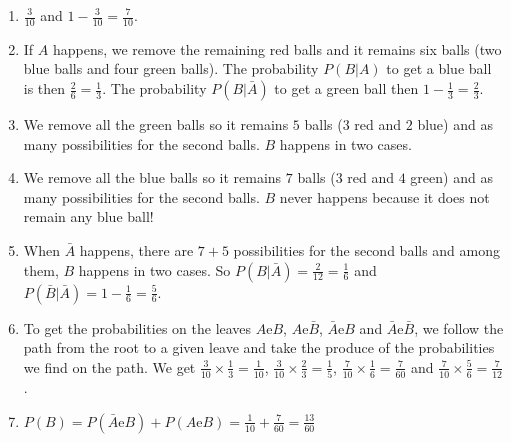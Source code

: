 \begin{enumerate}
\item $\frac{3}{10}$ and $1 - \frac{3}{10} = \frac{7}{10}$.

\item If $A$ happens, we remove the remaining red balls and it remains
  six balls (two blue balls and four green balls). The probability
  $P(B|A)$ to get a blue ball is then $\frac{2}{6} = \frac{1}{3}$.
  The probability $P(B|\bar{A})$ to get a green ball then
  $1 - \frac{1}{3} = \frac{2}{3}$.

\item We remove all the green balls so it remains $5$ balls
  ($3$ red and $2$ blue) and as many possibilities for the second balls.
  $B$ happens in two cases.

\item We remove all the blue balls so it remains $7$ balls
  ($3$ red and $4$ green) and as many possibilities for the second balls.
  $B$ never happens because it does not remain any blue ball!

\item When $\bar{A}$ happens, there are $7+5$ possibilities for the second
  balls and among them, $B$ happens in two cases.
  So $P(B|\bar{A}) = \frac{2}{12} = \frac{1}{6}$ and
  $P(\bar{B}|\bar{A}) = 1 - \frac{1}{6} = \frac{5}{6}$.

\begin{center}
\end{center}

\item To get the probabilities on the leaves
  $A \text{e} B$, $A \text{e} \bar{B}$, $\bar{A} \text{e} B$ and
  $\bar{A} \text{e} \bar{B}$,
  we follow the path from the root to a given leave and take the produce of
  the probabilities we find on the path. We get
  $\frac{3}{10} \times \frac{1}{3}= \frac{1}{10}$,
  $\frac{3}{10} \times \frac{2}{3} = \frac{1}{5}$,
  $\frac{7}{10} \times \frac{1}{6} = \frac{7}{60}$ and
  $\frac{7}{10} \times \frac{5}{6} = \frac{7}{12}$.

\item ${P(B)} = {P(\bar{A} \text{e} B)} +
  {P(A \text{e} B)} =  \frac{1}{10} + \frac{7}{60} = \frac{13}{60}$

\end{enumerate}

